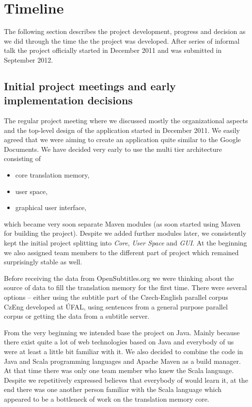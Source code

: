 \section{Timeline}

The following section describes the project development, progress and decision as we did through the time the the project was developed. After series of informal talk the project officially started in December 2011 and was submitted in September 2012.

\subsection{Initial project meetings and early implementation decisions}

The regular project meeting where we discussed mostly the organizational aspects and the top-level design of the application started in December 2011. We easily agreed that we were aiming to create an application quite similar to the Google Documents. We have decided very early to use the multi tier architecture consisting of

\begin{itemize}
\item core translation memory,
\item user space,
\item graphical user interface,
\end{itemize}

which became very soon separate Maven modules (as soon started using Maven for building the project). Despite we added further modules later, we consistently kept the initial project splitting into \emph{Core}, \emph{User Space} and \emph{GUI}. At the beginning we also assigned team members to the different part of project which remained surprisingly stable as well. 

Before receiving the data from OpenSubtitles.org we were thinking about the source of data to fill the translation memory for the first time. There were several options -- either using the subtitle part of the Czech-English parallel corpus CzEng developed at ÚFAL, using sentences from a general purpose parallel corpus or getting the data from a subtitle server.

From the very beginning we intended base the project on Java. Mainly because there exist quite a lot of web technologies based on Java and everybody of us were at least a little bit familiar with it. We also decided to combine the code in Java and Scala programming languages and Apache Maven as a build manager. At that time there was only one team member who knew the Scala language. Despite we repetitively expressed believes that everybody of would learn it, at the end there was one another person familiar with the Scala language which appeared to be a bottleneck of work on the translation memory core.

